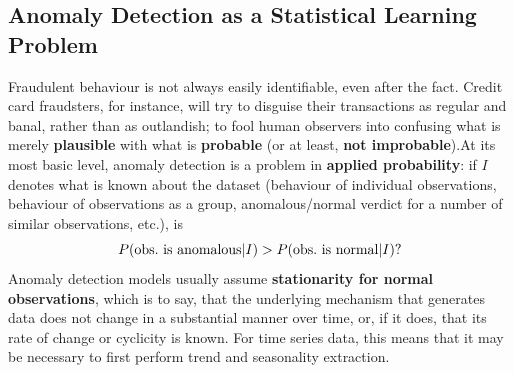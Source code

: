 \subsection{Anomaly Detection as a Statistical Learning Problem}
Fraudulent behaviour is not always easily identifiable, even after the fact. Credit card fraudsters, for instance, will try to disguise their transactions as regular and banal, rather than as outlandish; to fool human observers into confusing what is merely \textbf{plausible} with what is \textbf{probable} (or at least, \textbf{not improbable}).\newl At its most basic level, anomaly detection is a problem in \textbf{applied probability}: if $I$ denotes what is known about the dataset (behaviour of individual observations, behaviour of observations as a group, anomalous/normal verdict for a number of similar observations, etc.), is $$P(\text{obs.\@ is anomalous}|I) > P(\text{obs.\@ is normal}|I)?$$ 
Anomaly detection models usually assume \textbf{stationarity for normal observations}, which is to say, that the underlying mechanism that generates data does not change in a substantial manner over time, or, if it does, that its rate of change or cyclicity is known. \newl For time series data, this means that it may be necessary to first perform trend and seasonality extraction.
